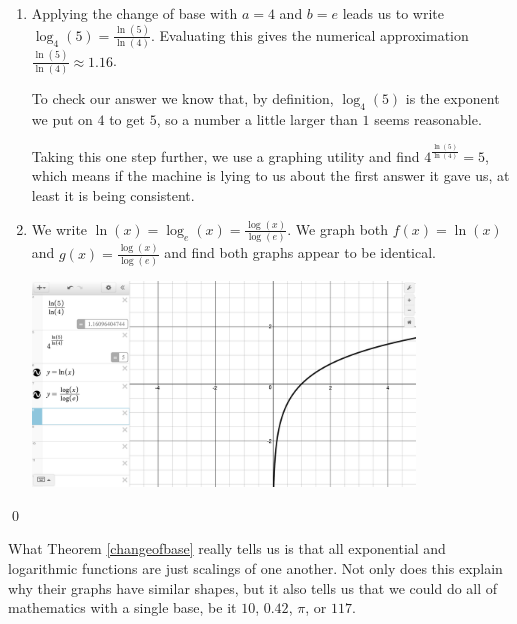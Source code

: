 \begin{ex}
\begin{enumerate}
\begin{center}
\end{center}

\item  Applying the change of base with $a=4$ and $b=e$ leads us to write $\log_{4}(5) = \frac{\ln(5)}{\ln(4)}$.  Evaluating this gives the numerical approximation  $\frac{\ln(5)}{\ln(4)} \approx 1.16$. 

\smallskip

To check our answer we know that,  by definition, $\log_{4}(5)$ is the exponent we put on $4$ to get $5$, so a number a little larger than $1$ seems reasonable.

\smallskip

Taking this one step further, we use a graphing utility and find $4^{ \frac{\ln(5)}{\ln(4)}} = 5$, which means if  the machine  is lying to us about the first answer it gave us, at least it is being consistent.

\item  We write $\ln(x) = \log_{e}(x) = \frac{\log(x)}{\log(e)}$.  We graph both $f(x) = \ln(x)$ and $g(x) = \frac{\log(x)}{\log(e)}$ and find both graphs appear to be identical.

\begin{center}

\includegraphics[width=4in]{./PropertiesofLogarithmsGraphics/LogProps02.jpg} 

\end{center}

\end{enumerate}

 \qed

\end{ex}

What Theorem \ref{changeofbase} really tells us is that all exponential and logarithmic functions are just scalings of one another.  Not only does this explain why their graphs have similar shapes, but it also tells us that we could do all of mathematics with a single base,  be it $10$, $0.42$, $\pi$, or $117$. 

